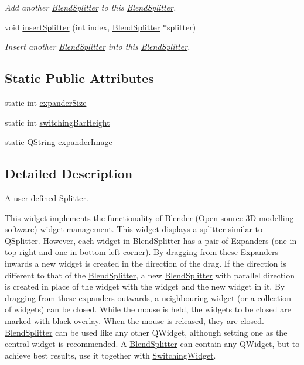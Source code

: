 \begin{DoxyCompactItemize}
\begin{DoxyCompactList}\small\item\em Add another \hyperlink{class_blend_splitter}{Blend\+Splitter} to this \hyperlink{class_blend_splitter}{Blend\+Splitter}. \end{DoxyCompactList}\item 
void \hyperlink{class_blend_splitter_a5e1adaac62d47cc3815835e713373e2b}{insert\+Splitter} (int index, \hyperlink{class_blend_splitter}{Blend\+Splitter} $\ast$splitter)
\begin{DoxyCompactList}\small\item\em Insert another \hyperlink{class_blend_splitter}{Blend\+Splitter} into this \hyperlink{class_blend_splitter}{Blend\+Splitter}. \end{DoxyCompactList}\end{DoxyCompactItemize}
\subsection*{Static Public Attributes}
\begin{DoxyCompactItemize}
\item 
static int \hyperlink{class_blend_splitter_a233a45efce9417f826d76ce54d832d50}{expander\+Size}
\item 
static int \hyperlink{class_blend_splitter_a478fa3cfcf59f76edf8f021bee297e0d}{switching\+Bar\+Height}
\item 
static Q\+String \hyperlink{class_blend_splitter_a38c7ab0fb471718aca5eb3fe09aa124b}{expander\+Image}
\end{DoxyCompactItemize}


\subsection{Detailed Description}
A user-\/defined Splitter. 

This widget implements the functionality of Blender (Open-\/source 3D modelling software) widget management. This widget displays a splitter similar to Q\+Splitter. However, each widget in \hyperlink{class_blend_splitter}{Blend\+Splitter} has a pair of Expanders (one in top right and one in bottom left corner). By dragging from these Expanders inwards a new widget is created in the direction of the drag. If the direction is different to that of the \hyperlink{class_blend_splitter}{Blend\+Splitter}, a new \hyperlink{class_blend_splitter}{Blend\+Splitter} with parallel direction is created in place of the widget with the widget and the new widget in it. By dragging from these expanders outwards, a neighbouring widget (or a collection of widgets) can be closed. While the mouse is held, the widgets to be closed are marked with black overlay. When the mouse is released, they are closed. \hyperlink{class_blend_splitter}{Blend\+Splitter} can be used like any other Q\+Widget, although setting one as the central widget is recommended. A \hyperlink{class_blend_splitter}{Blend\+Splitter} can contain any Q\+Widget, but to achieve best results, use it together with \hyperlink{class_switching_widget}{Switching\+Widget}. 

